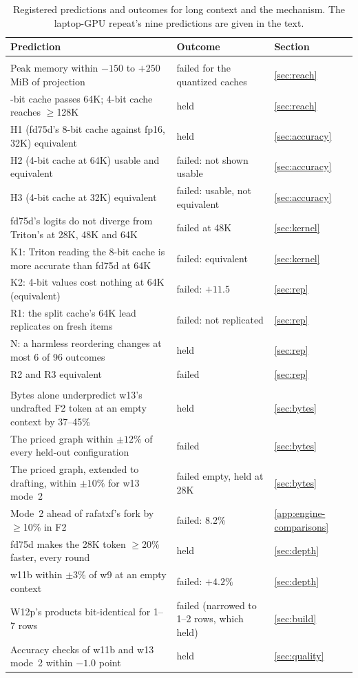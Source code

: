 \documentclass[11pt,letterpaper]{article}
\begin{document}
\begin{table}[!tbp]\centering\footnotesize\setlength{\tabcolsep}{4pt}
\begin{tabular}{@{}>{\raggedright\arraybackslash}p{3.75in}>{\raggedright\arraybackslash}p{1.95in}l@{}}
\toprule
Prediction & Outcome & Section\\\midrule
\multicolumn{3}{@{}l}{\textit{Long context}}\\
Peak memory within $-150$ to $+250$\,MiB of projection & failed for the quantized caches & \ref{sec:reach}\\
8-bit cache passes 64K; 4-bit cache reaches $\geq$128K & held & \ref{sec:reach}\\
H1 (fd75d's 8-bit cache against fp16, 32K) equivalent & held & \ref{sec:accuracy}\\
H2 (4-bit cache at 64K) usable and equivalent & failed: not shown usable & \ref{sec:accuracy}\\
H3 (4-bit cache at 32K) equivalent & failed: usable, not equivalent & \ref{sec:accuracy}\\
fd75d's logits do not diverge from Triton's at 28K, 48K and 64K & failed at 48K & \ref{sec:kernel}\\
K1: Triton reading the 8-bit cache is more accurate than fd75d at 64K & failed: equivalent & \ref{sec:kernel}\\
K2: 4-bit values cost nothing at 64K (equivalent) & failed: $+11.5$ & \ref{sec:rep}\\
R1: the split cache's 64K lead replicates on fresh items & failed: not replicated & \ref{sec:rep}\\
N: a harmless reordering changes at most 6 of 96 outcomes & held & \ref{sec:rep}\\
R2 and R3 equivalent & failed & \ref{sec:rep}\\
\multicolumn{3}{@{}l}{\textit{Mechanism}}\\
Bytes alone underpredict w13's undrafted F2 token at an empty context by 37--45\% & held & \ref{sec:bytes}\\
The priced graph within $\pm12\%$ of every held-out configuration & failed & \ref{sec:bytes}\\
The priced graph, extended to drafting, within $\pm10\%$ for w13 mode~2 & failed empty, held at 28K & \ref{sec:bytes}\\
Mode~2 ahead of rafatxf's fork by $\geq$10\% in F2 & failed: 8.2\% & \ref{app:engine-comparisons}\\
fd75d makes the 28K token $\geq$20\% faster, every round & held & \ref{sec:depth}\\
w11b within $\pm3\%$ of w9 at an empty context & failed: $+4.2\%$ & \ref{sec:depth}\\
W12p's products bit-identical for 1--7 rows & failed (narrowed to 1--2 rows, which held) & \ref{sec:build}\\
Accuracy checks of w11b and w13 mode~2 within $-1.0$ point & held & \ref{sec:quality}\\
\bottomrule\end{tabular}
\caption{Registered predictions and outcomes for long context and the
mechanism. The laptop-GPU repeat's nine predictions are given in the text.}
\label{tab:predictions-context}
\end{table}
\end{document}
